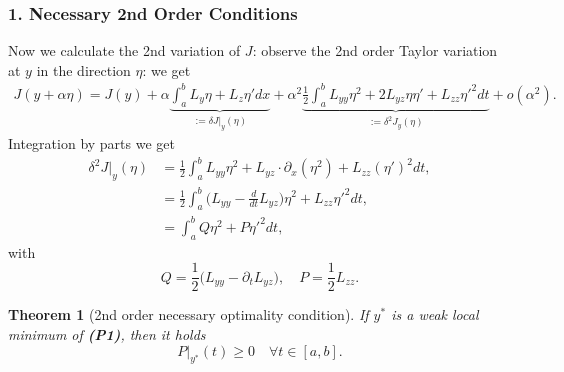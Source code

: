 \documentclass[a4paper,11pt,fleqn]{book}
\newtheorem{theorem}{Theorem}[section]
\theoremstyle{definition}
\theoremstyle{remark}
\begin{document}
\subsubsection{1. Necessary 2nd Order Conditions}
Now we calculate the 2nd variation of $J$: observe the 2nd order Taylor variation at $y$ in the direction $\eta$:
we get
\begin{align*}
	J(y + \alpha \eta) = J(y) + 
	\alpha 
	\underbrace{\int_a^b L_y \eta + L_z \eta' dx}_{:= \delta J|_y(\eta)} 
	+ \alpha^2
	\underbrace{\frac{1}{2} \int_a^b L_{yy} \eta^2 + 2 L_{yz}\eta \eta' + L_{zz} \eta'^2 dt}_{:= \delta^2 J_y(\eta)} 
	+ o(\alpha^2). 
\end{align*}
Integration by parts we get
\begin{equation}
\begin{aligned}
	\delta^2 J|_y(\eta) 
	& = \frac{1}{2} \int_a^b   L_{yy} \eta^2  
	+ L_{yz} \cdot \partial_x(\eta^2) + L_{zz} (\eta')^2 dt,\\
	& = \frac{1}{2} \int_a^b \bigg(L_{yy} -  \frac{d}{dt} L_{yz} \bigg) \eta^2 
	+ L_{zz} \eta'^2 dt,\\
	& = \int_a^b Q \eta^2 + P \eta'^2dt,
\end{aligned}
\end{equation}
with
\begin{equation*}
	Q = \frac{1}{2}\bigg(L_{yy} - \partial_t L_{yz} \bigg), \quad P = \frac{1}{2} L_{zz}. 
\end{equation*}
\begin{theorem}[2nd order necessary optimality condition]
	If $y^*$ is a weak local minimum of \textbf{(P1)}, then it holds
	\begin{equation}
		P|_{y^*}(t) \ge 0  \quad \forall t \in [a, b].
	\end{equation}
\end{theorem}
\end{document}
